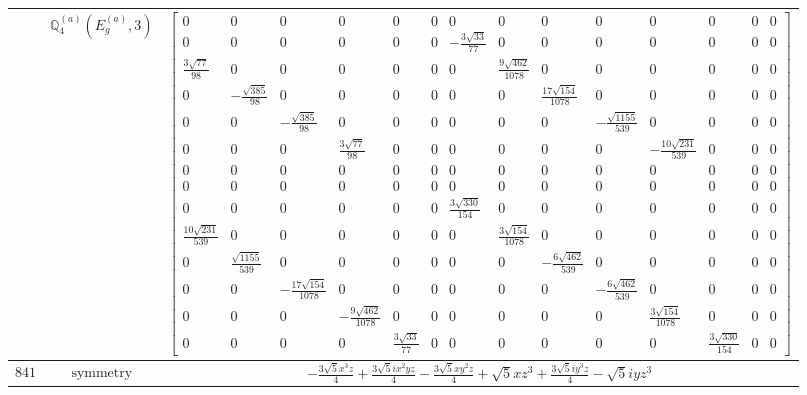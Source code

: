 \documentclass[fleqn,8pt,landscape]{jsarticle}
\begin{document}
\begin{longtable}{ccc}
$  $ & $ \mathbb{Q}_{4}^{(a)}(E_{g}^{(a)},3) $ & $ \begin{bmatrix} 0 & 0 & 0 & 0 & 0 & 0 & 0 & 0 & 0 & 0 & 0 & 0 & 0 & 0 \\ 0 & 0 & 0 & 0 & 0 & 0 & - \frac{3 \sqrt{33}}{77} & 0 & 0 & 0 & 0 & 0 & 0 & 0 \\ \frac{3 \sqrt{77}}{98} & 0 & 0 & 0 & 0 & 0 & 0 & \frac{9 \sqrt{462}}{1078} & 0 & 0 & 0 & 0 & 0 & 0 \\ 0 & - \frac{\sqrt{385}}{98} & 0 & 0 & 0 & 0 & 0 & 0 & \frac{17 \sqrt{154}}{1078} & 0 & 0 & 0 & 0 & 0 \\ 0 & 0 & - \frac{\sqrt{385}}{98} & 0 & 0 & 0 & 0 & 0 & 0 & - \frac{\sqrt{1155}}{539} & 0 & 0 & 0 & 0 \\ 0 & 0 & 0 & \frac{3 \sqrt{77}}{98} & 0 & 0 & 0 & 0 & 0 & 0 & - \frac{10 \sqrt{231}}{539} & 0 & 0 & 0 \\ 0 & 0 & 0 & 0 & 0 & 0 & 0 & 0 & 0 & 0 & 0 & 0 & 0 & 0 \\ 0 & 0 & 0 & 0 & 0 & 0 & 0 & 0 & 0 & 0 & 0 & 0 & 0 & 0 \\ 0 & 0 & 0 & 0 & 0 & 0 & \frac{3 \sqrt{330}}{154} & 0 & 0 & 0 & 0 & 0 & 0 & 0 \\ \frac{10 \sqrt{231}}{539} & 0 & 0 & 0 & 0 & 0 & 0 & \frac{3 \sqrt{154}}{1078} & 0 & 0 & 0 & 0 & 0 & 0 \\ 0 & \frac{\sqrt{1155}}{539} & 0 & 0 & 0 & 0 & 0 & 0 & - \frac{6 \sqrt{462}}{539} & 0 & 0 & 0 & 0 & 0 \\ 0 & 0 & - \frac{17 \sqrt{154}}{1078} & 0 & 0 & 0 & 0 & 0 & 0 & - \frac{6 \sqrt{462}}{539} & 0 & 0 & 0 & 0 \\ 0 & 0 & 0 & - \frac{9 \sqrt{462}}{1078} & 0 & 0 & 0 & 0 & 0 & 0 & \frac{3 \sqrt{154}}{1078} & 0 & 0 & 0 \\ 0 & 0 & 0 & 0 & \frac{3 \sqrt{33}}{77} & 0 & 0 & 0 & 0 & 0 & 0 & \frac{3 \sqrt{330}}{154} & 0 & 0 \end{bmatrix} $ \\ \hline
$ 841 $ & $ \text{symmetry} $ & $ - \frac{3 \sqrt{5} x^{3} z}{4} + \frac{3 \sqrt{5} i x^{2} y z}{4} - \frac{3 \sqrt{5} x y^{2} z}{4} + \sqrt{5} x z^{3} + \frac{3 \sqrt{5} i y^{3} z}{4} - \sqrt{5} i y z^{3} $ \\

\end{longtable}
\end{document}
